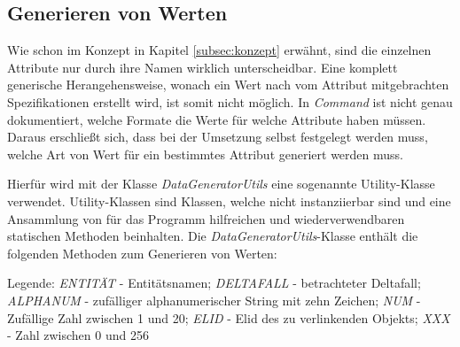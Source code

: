 \subsection{Generieren von Werten}\label{subsec:generatingValues}
Wie schon im Konzept in Kapitel \ref{subsec:konzept} erwähnt, sind die einzelnen Attribute nur durch ihre Namen wirklich unterscheidbar. Eine komplett generische Herangehensweise, wonach ein Wert nach vom Attribut mitgebrachten Spezifikationen erstellt wird, ist somit nicht möglich. In \textit{Command} ist nicht genau dokumentiert, welche Formate die Werte für welche Attribute haben müssen. Daraus erschließt sich, dass bei der Umsetzung selbst festgelegt werden muss, welche Art von Wert für ein bestimmtes Attribut generiert werden muss.

Hierfür wird mit der Klasse \textit{DataGeneratorUtils} eine sogenannte Utility-Klasse verwendet. Utility-Klassen sind Klassen, welche nicht instanziierbar sind und eine Ansammlung von für das Programm hilfreichen und wiederverwendbaren statischen Methoden beinhalten. \cite[S. 19]{bloch:2008} Die \textit{DataGeneratorUtils}-Klasse enthält die folgenden Methoden zum Generieren von Werten:

\begin{center}
    \footnotesize
    Legende: \textit{ENTITÄT} - Entitätsnamen; \textit{DELTAFALL} - betrachteter Deltafall; \textit{ALPHANUM} - zufälliger alphanumerischer String mit zehn Zeichen; \textit{NUM} - Zufällige Zahl zwischen 1 und 20; \textit{ELID} - \ac{Elid} des zu verlinkenden Objekts; \textit{XXX} - Zahl zwischen 0 und 256
\end{center}

